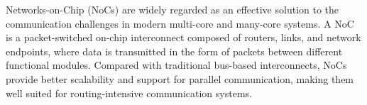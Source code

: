 Networks-on-Chip (NoCs) are widely regarded as an effective solution to the communication challenges in modern multi-core and many-core systems. A NoC is a packet-switched on-chip interconnect composed of routers, links, and network endpoints, where data is transmitted in the form of packets between different functional modules. Compared with traditional bus-based interconnects, NoCs provide better scalability and support for parallel communication, making them well suited for routing-intensive communication systems.